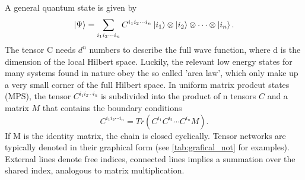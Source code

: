 \documentclass[twocolumn]{article}
\newcounter{a}
\newcounter{b}
\begin{document}
A general quantum state is given by
\begin{equation}
    \ket{\Psi} = \sum_{i_1 i_2 \cdots i_n } C^{i_1 i_2 \cdots i_n} \ket{i_1} \otimes \ket{i_2} \otimes \cdots \otimes \ket{i_n}.
\end{equation}
The tensor C needs $d^n$ numbers to describe the full wave function, where d is the dimension of the local Hilbert space. Luckily, the relevant low energy states for many systems found in nature obey the so called 'area law', which only make up a very small corner of the full Hilbert space. In uniform matrix prodcut states (MPS), the tensor $ C^{i_1 i_2 \cdots i_n}$ is subdivided into the product of n tensors $C$ and a matrix $M$ that contains the boundary conditions
\begin{equation} \label{c_split}
    C^{i_1 i_2 \cdots i_n} = Tr( C^{i_1} C^{i_2} \cdots C^{i_n} M  ).
\end{equation}
If M is the identity matrix, the chain is closed cyclically. Tensor networks are typically denoted in their graphical form (see \cref{tab:grafical_not} for examples). External lines denote free indices, connected lines implies a summation over the shared index, analogous to matrix multiplication.
\end{document}
